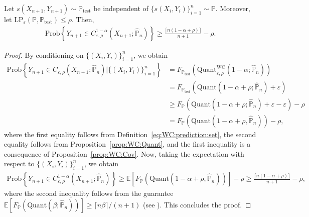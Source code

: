 \documentclass[11pt,a4paper]{article}
\begin{document}
\begin{theorem}
\label{thm:robust:CP}
Let $s(X_{n+1}, Y_{n+1}) \sim \mathbb P_{\text{test}}$ be independent of $\{s(X_i, Y_i)\}_{i=1}^n \sim \mathbb P$. Moreover, let $\text{LP}_\varepsilon(\mathbb P, \mathbb P_{\text{test}}) \leq \rho$. Then, 
\begin{align}
\label{eq:robust:CP}
    \text{Prob}\left\{ Y_{n+1} \in C_{\varepsilon,\rho}^{1-\alpha}\left(X_{n+1};\widehat{\mathbb P}_n \right) \right\} \geq \frac{\lceil n(1-\alpha+\rho)\rceil}{n+1}-\rho.
\end{align}
\end{theorem}
\begin{proof}
By conditioning on $\{(X_i,Y_i)\}_{i=1}^n$, we obtain
\begin{align*}
    \text{Prob}\left\{Y_{n+1}\in C_{\varepsilon,\rho}(X_{n+1};\widehat{\mathbb P}_n)|\{(X_i,Y_i)\}_{i=1}^n\right\} & = F_{\mathbb P_{\text{test}}}\left(\text{Quant}_{\varepsilon,\rho}^{\text{WC}} \left(1 - \alpha;\widehat{\mathbb P}_n \right)\right)
    \\& = F_{\mathbb P_{\text{test}}}\left(\text{Quant} \left(1-\alpha +\rho; \widehat{\mathbb P}_n \right)+\varepsilon\right)
    \\& \geq F_{\mathbb P}\left(\text{Quant}\left(1-\alpha +\rho; \widehat{\mathbb P}_n\right)+\varepsilon -\varepsilon\right) -\rho\\
    &= F_{\mathbb P}\left(\text{Quant}\left(1-\alpha +\rho, \widehat{\mathbb P}_n\right)\right)-\rho,
\end{align*}
where the first equality follows from Definition~\ref{eq:WC:prediction:set}, the second equality follows from Proposition~\ref{prop:WC:Quant}, and the first inequality is a consequence of Proposition~\ref{prop:WC:Cov}. Now, taking the expectation with respect to $\{(X_i,Y_i)\}_{i=1}^n$, we obtain
\begin{align*}
    \text{Prob}\left\{Y_{n+1}\in C_{\varepsilon,\rho}^{1-\alpha}\left(X_{n+1};\widehat{\mathbb P}_n \right)\right\} \geq \mathbb E \left[ F_{\mathbb P}\left(\text{Quant}\left(1-\alpha +\rho, \widehat{\mathbb P}_n\right)\right) \right] -\rho \geq \frac{\lceil n(1-\alpha+\rho)\rceil}{n+1}-\rho,
\end{align*}
where the second inequality follows from the guarantee $\mathbb{E}\left[F_{\mathbb P}(\text{Quant}(\beta; \widehat{\mathbb P}_n))\right] \geq {\lceil n\beta\rceil}/{(n+1)}$ (see \cite[Lemma~D.3]{cauchois2024robust}). This concludes the proof.
\end{proof}
\end{document}
